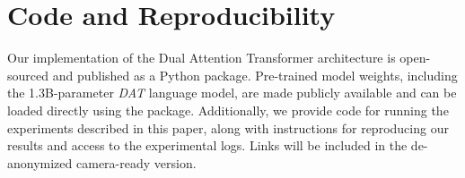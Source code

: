 \section*{Code and Reproducibility}

Our implementation of the Dual Attention Transformer architecture is open-sourced and published as a Python package. Pre-trained model weights, including the 1.3B-parameter \textit{DAT} language model, are made publicly available and can be loaded directly using the package. Additionally, we provide code for running the experiments described in this paper, along with instructions for reproducing our results and access to the experimental logs. Links will be included in the de-anonymized camera-ready version.

